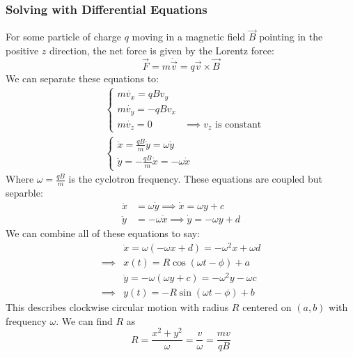 \documentclass[a4paper]{article}
\begin{document}
\subsubsection{Solving with Differential Equations}
For some particle of charge $q$ moving in a magnetic field $\vec{B}$ pointing in
the positive $z$ direction, the net force is given by the Lorentz force:
\[
    \vec{F}=m\dot{\vec{v}}=q\vec{v}\times\vec{B}
\]
We can separate these equations to:
\begin{align*}
	&\begin{cases}
        m\dot{v_x}=qBv_y\\
        m\dot{v_y}=-qBv_x\\
        m\dot{v_z}=0 & \implies v_z \text{ is constant}
    \end{cases}\\
    &\begin{cases}
        \ddot{x}=\frac{qB}{m}\dot{y}=\omega\dot{y}\\
        \ddot{y}=-\frac{qB}{m}\dot{x}=-\omega\dot{x}
    \end{cases}
\end{align*}
Where $\omega=\frac{qB}{m}$ is the cyclotron frequency. These equations are
coupled but separble:
\begin{align*}
    \ddot{x} &= \omega\dot{y} \implies \dot{x}=\omega y + c\\
    \ddot{y} &= -\omega \dot{x} \implies \dot{y}=-\omega y + d
\end{align*}
We can combine all of these equations to say:
\begin{align*}
    &\ddot{x} = \omega(-\omega x + d) = -\omega^2x+\omega d\\
    \implies&x(t)=R\cos(\omega t-\phi)+a\\
    &\ddot{y}=-\omega(\omega y+c)=-\omega^2y-\omega c\\
    \implies&y(t)=-R\sin(\omega t - \phi)+b
\end{align*}
This describes clockwise circular motion with radius $R$ centered on $(a,b)$
    with frequency $\omega$. We can find $R$ as
\[
    R = \frac{x^2+y^2}{\omega} = \frac{v}{\omega} = \frac{mv}{qB}    
\]
\end{document}
